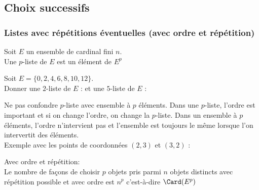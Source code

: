 \documentclass[a4paper, 11pt]{article}
\begin{document}
\subsection{Choix successifs}

\subsubsection{Listes avec r\'ep\'etitions \'eventuelles (avec ordre et r\'ep\'etition)}

 {\noindent 

\begin{defi} 
Soit $E$ un ensemble de cardinal fini $n$. \vsec\\
Une $p$-liste de $E$ est un élément de $E^p$
\end{defi}
 }\vsec

\begin{exemple}
Soit $E=\lbrace 0,2,4,6,8,10,12\rbrace$. \\
Donner une $2$-liste de $E$ : \dotfill et une $5$-liste de $E$ :\dotfill
\end{exemple}

\begin{rem}
\noindent \warning  Ne pas confondre $p$-liste avec ensemble \`a $p$ \'el\'ements. Dans une $p$-liste, l'ordre est important et si on change l'ordre, on change la $p$-liste. Dans un ensemble \`a $p$ \'el\'ements, l'ordre n'intervient pas et l'ensemble est toujours le m\^eme lorsque l'on intervertit des \'el\'ements.\\
Exemple avec les points de coordonn\'ees $(2,3)$ et $(3,2)$ :

\end{rem}




\begin{prop} Avec ordre et r\'ep\'etition:\\
Le nombre de fa\c{c}ons de choisir $p$ objets pris parmi $n$ objets distincts avec r\'ep\'etition possible et avec ordre est $n^p$ c'est-\`a-dire $\Card(E^p)$
\end{prop}
\end{document}
